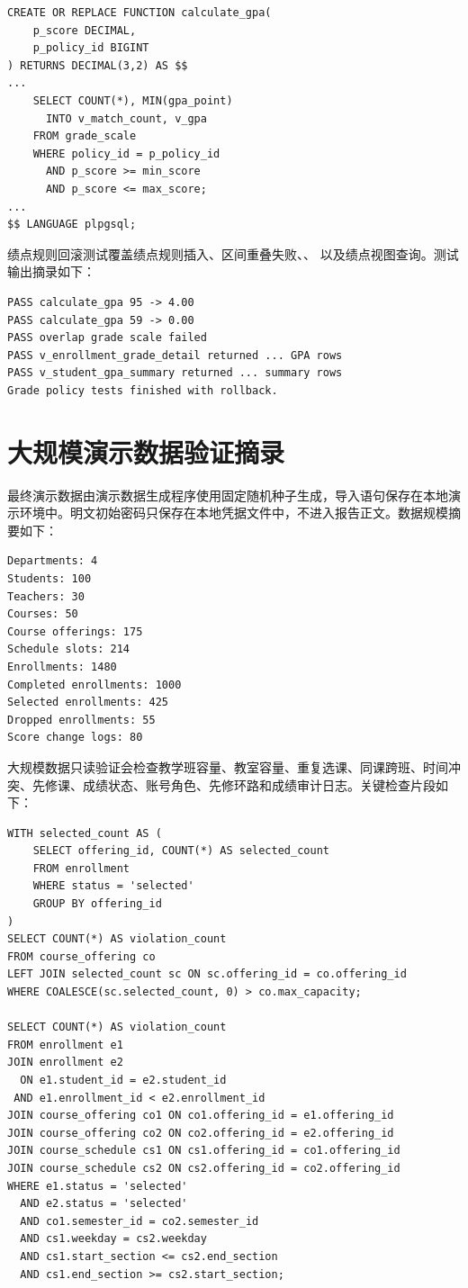 \begin{lstlisting}[style=sqlstyle]
CREATE OR REPLACE FUNCTION calculate_gpa(
    p_score DECIMAL,
    p_policy_id BIGINT
) RETURNS DECIMAL(3,2) AS $$
...
    SELECT COUNT(*), MIN(gpa_point)
      INTO v_match_count, v_gpa
    FROM grade_scale
    WHERE policy_id = p_policy_id
      AND p_score >= min_score
      AND p_score <= max_score;
...
$$ LANGUAGE plpgsql;
\end{lstlisting}

绩点规则回滚测试覆盖绩点规则插入、区间重叠失败、、 以及绩点视图查询。测试输出摘录如下：

\begin{lstlisting}[style=codestyle]
PASS calculate_gpa 95 -> 4.00
PASS calculate_gpa 59 -> 0.00
PASS overlap grade scale failed
PASS v_enrollment_grade_detail returned ... GPA rows
PASS v_student_gpa_summary returned ... summary rows
Grade policy tests finished with rollback.
\end{lstlisting}

\section{大规模演示数据验证摘录}

最终演示数据由演示数据生成程序使用固定随机种子生成，导入语句保存在本地演示环境中。明文初始密码只保存在本地凭据文件中，不进入报告正文。数据规模摘要如下：

\begin{lstlisting}[style=codestyle]
Departments: 4
Students: 100
Teachers: 30
Courses: 50
Course offerings: 175
Schedule slots: 214
Enrollments: 1480
Completed enrollments: 1000
Selected enrollments: 425
Dropped enrollments: 55
Score change logs: 80
\end{lstlisting}

大规模数据只读验证会检查教学班容量、教室容量、重复选课、同课跨班、时间冲突、先修课、成绩状态、账号角色、先修环路和成绩审计日志。关键检查片段如下：

\begin{lstlisting}[style=sqlstyle]
WITH selected_count AS (
    SELECT offering_id, COUNT(*) AS selected_count
    FROM enrollment
    WHERE status = 'selected'
    GROUP BY offering_id
)
SELECT COUNT(*) AS violation_count
FROM course_offering co
LEFT JOIN selected_count sc ON sc.offering_id = co.offering_id
WHERE COALESCE(sc.selected_count, 0) > co.max_capacity;

SELECT COUNT(*) AS violation_count
FROM enrollment e1
JOIN enrollment e2
  ON e1.student_id = e2.student_id
 AND e1.enrollment_id < e2.enrollment_id
JOIN course_offering co1 ON co1.offering_id = e1.offering_id
JOIN course_offering co2 ON co2.offering_id = e2.offering_id
JOIN course_schedule cs1 ON cs1.offering_id = co1.offering_id
JOIN course_schedule cs2 ON cs2.offering_id = co2.offering_id
WHERE e1.status = 'selected'
  AND e2.status = 'selected'
  AND co1.semester_id = co2.semester_id
  AND cs1.weekday = cs2.weekday
  AND cs1.start_section <= cs2.end_section
  AND cs1.end_section >= cs2.start_section;
\end{lstlisting}

